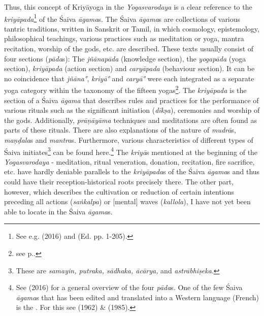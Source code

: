 Thus, this concept of Kriyāyoga in the \textit{Yogasvarodaya} is a clear reference to the \textit{kriyāpada}\footnote{See e.g. \citeauthor{ganesan2016saiva} (2016) and  (Ed. pp. 1-205).} of the Śaiva \textit{āgama}s. The Śaiva \textit{āgama}s are collections of various tantric traditions, written in Sanskrit or Tamil, in which cosmology, epistemology, philosophical teachings, various practices such as meditation or yoga, mantra recitation, worship of the gods, etc. are described. These texts usually consist of four sections (\textit{pāda}s): The \textit{jñānapāda} (knowledge section), the \textit{yogapāda} (yoga section), \textit{kriyāpada} (action section) and \textit{caryāpada} (behaviour section). It can be no coincidence that \textit{jñāna°}, \textit{kriyā°} and \textit{caryā°} were each integrated as a separate yoga category within the taxonomy of the fifteen yogas\footnote{see p.\pageref{intro}.}. The \textit{kriyāpada} is the section of a Śaiva \textit{āgama} that describes rules and practices for the performance of various rituals such as the significant initiation (\textit{dīkṣa}), ceremonies and worship of the gods. Additionally, \textit{prāṇāyāma} techniques and meditations are often found as parts of these rituals. There are also explanations of the nature of \textit{mudrā}s, \textit{maṇḍala}s and \textit{mantra}s. Furthermore, various characteristics of different types of Śaiva initiates\footnote{These are \textit{samayin, putraka, sādhaka, ācārya,} and \textit{astrābhiṣeka}.} can be found here.\footnote{See \citeauthor{ganesan2016saiva} (2016) for a general overview of the four \textit{pāda}s. One of the few Śaiva \textit{āgama}s that has been edited and translated into a Western language (French) is the . For this see \citeauthor{mrgendragama} (1962) \& \citeauthor{mrgendragamabrunner} (1985).} The \textit{kriyā}s mentioned at the beginning of the \textit{Yogasvarodaya} - meditation, ritual veneration, donation, recitation, fire sacrifice, etc. have hardly deniable parallels to the \textit{kriyāpada}s of the Śaiva \textit{āgama}s and thus could have their reception-historical roots precisely there. The other part, however, which describes the cultivation or reduction of certain intentions preceding all actions (\textit{saṅkalpa}) or [mental] waves (\textit{kallola}), I have not yet been able to locate in the Śaiva \textit{āgama}s.
%
